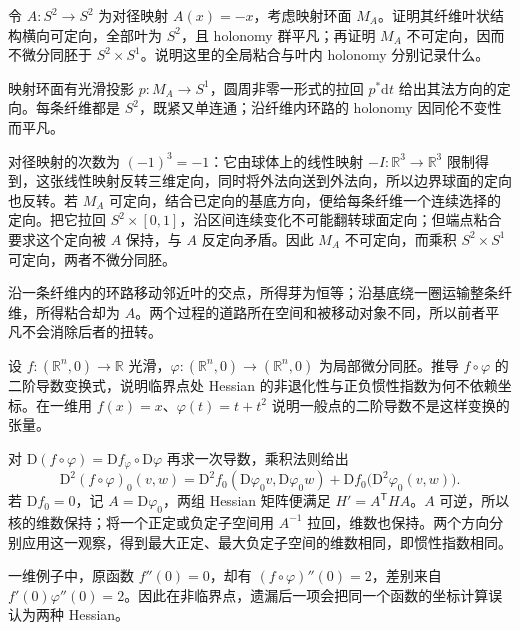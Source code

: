 \begin{exercise}\label{g2:ex:foliation-mapping-torus}
	令 \(A:S^2\to S^2\) 为对径映射 \(A(x)=-x\)，考虑映射环面 \(M_A\)。证明其纤维叶状结构横向可定向，全部叶为 \(S^2\)，且 holonomy 群平凡；再证明 \(M_A\) 不可定向，因而不微分同胚于 \(S^2\times S^1\)。说明这里的全局粘合与叶内 holonomy 分别记录什么。
\end{exercise}
\begin{solution}
	映射环面有光滑投影 \(p:M_A\to S^1\)，圆周非零一形式的拉回 \(p^*\mathrm dt\) 给出其法方向的定向。每条纤维都是 \(S^2\)，既紧又单连通；沿纤维内环路的 holonomy 因同伦不变性而平凡。

	对径映射的次数为 \((-1)^3=-1\)：它由球体上的线性映射 \(-I:\mathbb R^3\to\mathbb R^3\) 限制得到，这张线性映射反转三维定向，同时将外法向送到外法向，所以边界球面的定向也反转。若 \(M_A\) 可定向，结合已定向的基底方向，便给每条纤维一个连续选择的定向。把它拉回 \(S^2\times[0,1]\)，沿区间连续变化不可能翻转球面定向；但端点粘合要求这个定向被 \(A\) 保持，与 \(A\) 反定向矛盾。因此 \(M_A\) 不可定向，而乘积 \(S^2\times S^1\) 可定向，两者不微分同胚。

	沿一条纤维内的环路移动邻近叶的交点，所得芽为恒等；沿基底绕一圈运输整条纤维，所得粘合却为 \(A\)。两个过程的道路所在空间和被移动对象不同，所以前者平凡不会消除后者的扭转。
\end{solution}

\begin{exercise}\label{g2:ex:jet-hessian-coordinate}
	设 \(f:(\mathbb R^n,0)\to\mathbb R\) 光滑，\(\varphi:(\mathbb R^n,0)\to(\mathbb R^n,0)\) 为局部微分同胚。推导 \(f\circ\varphi\) 的二阶导数变换式，说明临界点处 Hessian 的非退化性与正负惯性指数为何不依赖坐标。在一维用 \(f(x)=x\)、\(\varphi(t)=t+t^2\) 说明一般点的二阶导数不是这样变换的张量。
\end{exercise}
\begin{solution}
	对 \(\mathrm D(f\circ\varphi)=\mathrm Df_{\varphi}\circ\mathrm D\varphi\) 再求一次导数，乘积法则给出
	\[
		\mathrm D^2(f\circ\varphi)_0(v,w)
		=\mathrm D^2f_0(\mathrm D\varphi_0v,\mathrm D\varphi_0w)
		+\mathrm Df_0\bigl(\mathrm D^2\varphi_0(v,w)\bigr).
	\]
	若 \(\mathrm Df_0=0\)，记 \(A=\mathrm D\varphi_0\)，两组 Hessian 矩阵便满足 \(H'=A^{\mathsf T}HA\)。\(A\) 可逆，所以核的维数保持；将一个正定或负定子空间用 \(A^{-1}\) 拉回，维数也保持。两个方向分别应用这一观察，得到最大正定、最大负定子空间的维数相同，即惯性指数相同。

	一维例子中，原函数 \(f''(0)=0\)，却有 \((f\circ\varphi)''(0)=2\)，差别来自 \(f'(0)\varphi''(0)=2\)。因此在非临界点，遗漏后一项会把同一个函数的坐标计算误认为两种 Hessian。
\end{solution}

